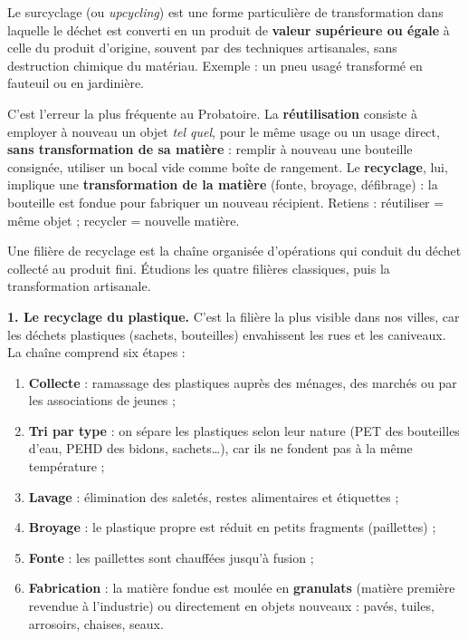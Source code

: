 \documentclass[11pt]{article}
\newcommand{\cle}[1]{{\popxbold\color{popdark}#1}}
\newcounter{popsec}
\newcounter{popsub}
\newcommand{\courssub}[1]{%
  \stepcounter{popsub}%
  \par\vspace{9pt}\noindent{\popxbold\fontsize{11.5}{13}\selectfont\color{popink}{\color{poporange}\thepopsec.\thepopsub}\hspace{6pt}#1}\par\nopagebreak\vspace{4pt}
}
\begin{document}
\begin{definition}
Le \cle{surcyclage} (ou \emph{upcycling}) est une forme particulière de transformation dans laquelle le déchet est converti en un produit de \textbf{valeur supérieure ou égale} à celle du produit d'origine, souvent par des techniques artisanales, sans destruction chimique du matériau. Exemple : un pneu usagé transformé en fauteuil ou en jardinière.
\end{definition}

\begin{attention}
C'est l'erreur la plus fréquente au Probatoire. La \textbf{réutilisation} consiste à employer à nouveau un objet \emph{tel quel}, pour le même usage ou un usage direct, \textbf{sans transformation de sa matière} : remplir à nouveau une bouteille consignée, utiliser un bocal vide comme boîte de rangement. Le \textbf{recyclage}, lui, implique une \textbf{transformation de la matière} (fonte, broyage, défibrage) : la bouteille est fondue pour fabriquer un nouveau récipient. Retiens : réutiliser = même objet ; recycler = nouvelle matière.
\end{attention}

\courssub{Les grandes filières de recyclage}

Une \cle{filière de recyclage} est la chaîne organisée d'opérations qui conduit du déchet collecté au produit fini. Étudions les quatre filières classiques, puis la transformation artisanale.

\textbf{1. Le recyclage du plastique.} C'est la filière la plus visible dans nos villes, car les déchets plastiques (sachets, bouteilles) envahissent les rues et les caniveaux. La chaîne comprend six étapes :

\begin{enumerate}
\item \textbf{Collecte} : ramassage des plastiques auprès des ménages, des marchés ou par les associations de jeunes ;
\item \textbf{Tri par type} : on sépare les plastiques selon leur nature (PET des bouteilles d'eau, PEHD des bidons, sachets\ldots), car ils ne fondent pas à la même température ;
\item \textbf{Lavage} : élimination des saletés, restes alimentaires et étiquettes ;
\item \textbf{Broyage} : le plastique propre est réduit en petits fragments (paillettes) ;
\item \textbf{Fonte} : les paillettes sont chauffées jusqu'à fusion ;
\item \textbf{Fabrication} : la matière fondue est moulée en \textbf{granulats} (matière première revendue à l'industrie) ou directement en objets nouveaux : pavés, tuiles, arrosoirs, chaises, seaux.
\end{enumerate}
\end{document}
